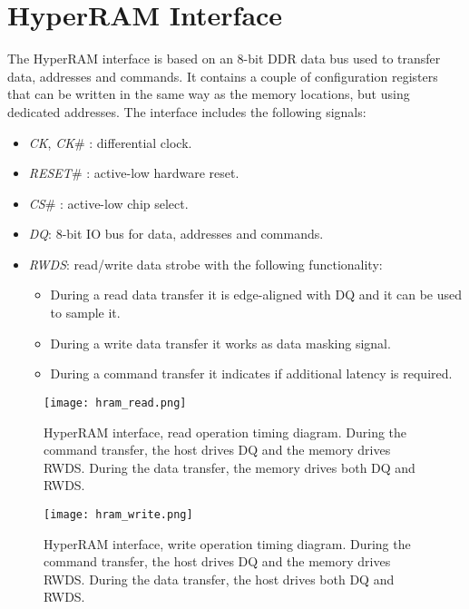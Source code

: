 \documentclass[10pt, english, a4paper, titlepage, oneside]{book}
\begin{document}
\section{HyperRAM Interface} \label{HyperRAM Interface}
\vspace{2mm}
The HyperRAM interface is based on an 8-bit \acrshort{DDR} data bus used to transfer data, addresses and commands. It contains a couple of configuration registers that can be written in the same way as the memory locations, but using dedicated addresses. The interface includes the following signals:
\vspace{2mm}
\begin{itemize}
    \item \textit{CK}, \textit{CK}\# : differential clock.
    \vspace{1mm}
    \item \textit{RESET}\# : active-low hardware reset.
    \vspace{1mm}
    \item \textit{CS}\# : active-low chip select.
    \vspace{1mm}
    \item \textit{DQ}: 8-bit IO bus for data, addresses and commands.
    \vspace{1mm}
    \item \textit{RWDS}: read/write data strobe with the following functionality:
    \begin{itemize}
        \item During a read data transfer it is edge-aligned with DQ and it can be used to sample it.
        \item During a write data transfer it works as data masking signal.
        \item During a command transfer it indicates if additional latency is required.
    \end{itemize}
\end{itemize}
\vspace{6mm}
\begin{figure}[H]
    \centering
    \captionsetup{width=16.5cm}
    \texttt{[image: hram\_read.png]}
    \vspace{5mm}
    \caption{HyperRAM interface, read operation timing diagram. During the command transfer, the host drives DQ and the memory drives RWDS. During the data transfer, the memory drives both DQ and RWDS.}
    \label{hram_read}
\end{figure}
\vspace{6mm}
\begin{figure}[H]
    \centering
    \captionsetup{width=16.5cm}
    \texttt{[image: hram\_write.png]}
    \vspace{5mm}
    \caption{\centering HyperRAM interface, write operation timing diagram. During the command transfer, the host drives DQ and the memory drives RWDS. During the data transfer, the host drives both DQ and RWDS.}
    \label{hram_write}
\end{figure}
\end{document}
